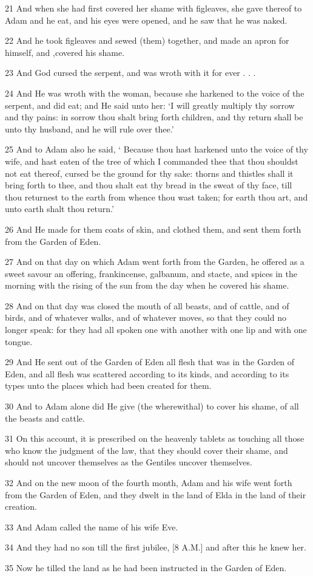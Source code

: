 \par 21 And when she had first covered her shame with figleaves, she gave thereof to Adam and he eat, and his eyes were opened, and he saw that he was naked.
\par 22 And he took figleaves and sewed (them) together, and made an apron for himself, and ,covered his shame.
\par 23 And God cursed the serpent, and was wroth with it for ever . . .
\par 24 And He was wroth with the woman, because she harkened to the voice of the serpent, and did eat; and He said unto her: ‘I will greatly multiply thy sorrow and thy pains: in sorrow thou shalt bring forth children, and thy return shall be unto thy husband, and he will rule over thee.’
\par 25 And to Adam also he said, ‘ Because thou hast harkened unto the voice of thy wife, and hast eaten of the tree of which I commanded thee that thou shouldst not eat thereof, cursed be the ground for thy sake: thorns and thistles shall it bring forth to thee, and thou shalt eat thy bread in the sweat of thy face, till thou returnest to the earth from whence thou wast taken; for earth thou art, and unto earth shalt thou return.’
\par 26 And He made for them coats of skin, and clothed them, and sent them forth from the Garden of Eden.
\par 27 And on that day on which Adam went forth from the Garden, he offered as a sweet savour an offering, frankincense, galbanum, and stacte, and spices in the morning with the rising of the sun from the day when he covered his shame.
\par 28 And on that day was closed the mouth of all beasts, and of cattle, and of birds, and of whatever walks, and of whatever moves, so that they could no longer speak: for they had all spoken one with another with one lip and with one tongue.
\par 29 And He sent out of the Garden of Eden all flesh that was in the Garden of Eden, and all flesh was scattered according to its kinds, and according to its types unto the places which had been created for them.
\par 30 And to Adam alone did He give (the wherewithal) to cover his shame, of all the beasts and cattle.
\par 31 On this account, it is prescribed on the heavenly tablets as touching all those who know the judgment of the law, that they should cover their shame, and should not uncover themselves as the Gentiles uncover themselves.
\par 32 And on the new moon of the fourth month, Adam and his wife went forth from the Garden of Eden, and they dwelt in the land of Elda in the land of their creation.
\par 33 And Adam called the name of his wife Eve.
\par 34 And they had no son till the first jubilee, [8 A.M.] and after this he knew her.
\par 35 Now he tilled the land as he had been instructed in the Garden of Eden.


